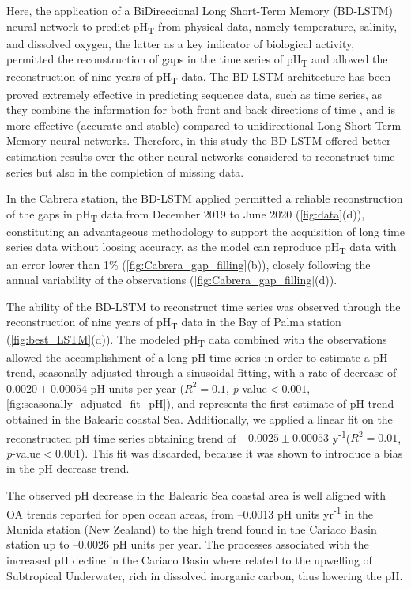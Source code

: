 Here, the application of a BiDireccional Long Short-Term Memory (BD-LSTM)
neural network to predict pH\textsubscript{T} from physical data, namely
temperature, salinity, and dissolved oxygen, the latter as a key indicator of
biological activity, permitted the reconstruction of gaps in the time series of
pH\textsubscript{T} and allowed the reconstruction of nine years of
pH\textsubscript{T} data. The BD-LSTM architecture has been proved extremely
effective in predicting sequence data, such as time series, as they combine the
information for both front and back directions of time \cite{graves2005}, and
is more effective (accurate and stable) compared to unidirectional Long
Short-Term Memory neural networks. Therefore, in this study the BD-LSTM offered
better estimation results over the other neural networks considered to
reconstruct time series but also in the completion of missing data.

In the Cabrera station, the BD-LSTM applied permitted a reliable
reconstruction of the gaps in pH\textsubscript{T} data from December 2019 to
June 2020 (\cref{fig:data}(d)), constituting an advantageous methodology to
support the acquisition of long time series data without loosing accuracy, as
the model can reproduce pH\textsubscript{T} data with an error lower than 1\%
(\cref{fig:Cabrera_gap_filling}(b)), closely following the annual variability
of the observations (\cref{fig:Cabrera_gap_filling}(d)).

The ability of the BD-LSTM to reconstruct time series was observed through
the reconstruction of nine years of pH\textsubscript{T} data in the Bay of
Palma station (\cref{fig:best_LSTM}(d)). The modeled pH\textsubscript{T} data
combined with the observations allowed the accomplishment of a long pH time
series in order to estimate a pH trend, seasonally adjusted through a
sinusoidal fitting, with a rate of decrease of $0.0020\pm 0.00054$ pH units per
year ($R^2=0.1$, \emph{p}-value$<0.001$,
\cref{fig:seasonally_adjusted_fit_pH}), and represents the first estimate of pH
trend obtained in the Balearic coastal Sea. Additionally, we applied a linear
fit on the reconstructed pH time series obtaining trend of $-0.0025\pm 0.00053$
y\textsuperscript{-1}($R^2=0.01$, \emph{p}-value$<0.001$). This fit was
discarded, because it was shown to introduce a bias in the pH decrease trend.

The observed pH decrease in the Balearic Sea coastal area is well aligned
with OA trends reported for open ocean areas, from –0.0013 pH units
yr\textsuperscript{-1} in the Munida station (New Zealand) to the high trend
found in the Cariaco Basin station up to –0.0026 pH units per
year\cite{Bates2014}. The processes associated with the increased pH decline in
the Cariaco Basin where related to the upwelling of Subtropical Underwater,
rich in dissolved inorganic carbon, thus lowering the pH.

